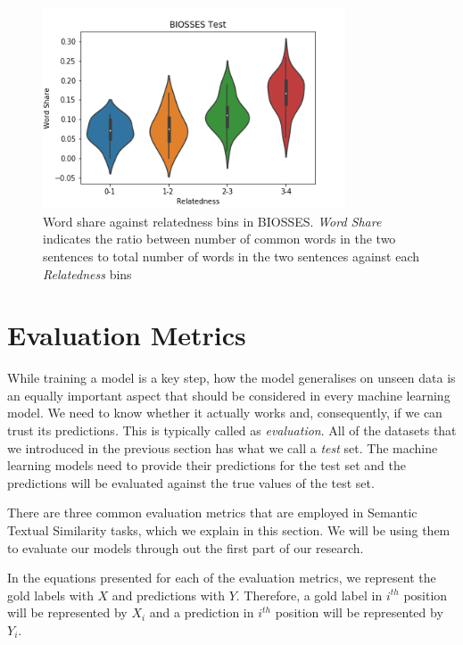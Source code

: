 \begin{enumerate}
\begin{figure}
	\centering
	\includegraphics[width=0.8\textwidth]{figures/semantic_textual_similarity/introduction/biosses_word_share.png}
	\caption[Word share against relatedness bins in BIOSSES.]{Word share against relatedness bins in BIOSSES. \textit{Word Share} indicates the ratio between number of common words in the two sentences to total number of words in the two sentences against each \textit{Relatedness} bins}
	\label{fig:biosses_word_share}
\end{figure}

\end{enumerate}

\section{Evaluation Metrics}
\label{sec:sts_evaluation}
While training a model is a key step, how the model generalises on unseen data is an equally important aspect that should be considered in every machine learning model. We need to know whether it actually works and, consequently, if we can trust its predictions. This is typically called as \textit{evaluation}. All of the datasets that we introduced in the previous section has what we call a \textit{test} set. The machine learning models need to provide their predictions for the test set and the predictions will be evaluated against the true values of the test set. 

There are three common evaluation metrics that are employed in Semantic Textual Similarity tasks, which we explain in this section. We will be using them to evaluate our models through out the first part of our research. 

In the equations presented for each of the evaluation metrics, we represent the gold labels with $X$ and predictions with $Y$. Therefore, a gold label in $i^{th}$ position will be represented by $X_i$ and a prediction in $i^{th}$ position will be represented by $Y_i$. 

